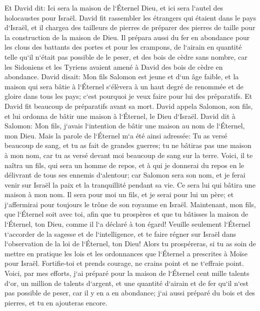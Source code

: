 \verse Et David dit: Ici sera la maison de l`Éternel Dieu, et ici sera l`autel des holocaustes pour Israël. 
\verse David fit rassembler les étrangers qui étaient dans le pays d`Israël, et il chargea des tailleurs de pierres de préparer des pierres de taille pour la construction de la maison de Dieu. 
\verse Il prépara aussi du fer en abondance pour les clous des battants des portes et pour les crampons, de l`airain en quantité telle qu`il n`était pas possible de le peser, 
\verse et des bois de cèdre sans nombre, car les Sidoniens et les Tyriens avaient amené à David des bois de cèdre en abondance. 
\verse David disait: Mon fils Salomon est jeune et d`un âge faible, et la maison qui sera bâtie à l`Éternel s`élèvera à un haut degré de renommée et de gloire dans tous les pays; c`est pourquoi je veux faire pour lui des préparatifs. Et David fit beaucoup de préparatifs avant sa mort. 
\verse David appela Salomon, son fils, et lui ordonna de bâtir une maison à l`Éternel, le Dieu d`Israël. 
\verse David dit à Salomon: Mon fils, j`avais l`intention de bâtir une maison au nom de l`Éternel, mon Dieu. 
\verse Mais la parole de l`Éternel m`a été ainsi adressée: Tu as versé beaucoup de sang, et tu as fait de grandes guerres; tu ne bâtiras pas une maison à mon nom, car tu as versé devant moi beaucoup de sang sur la terre. 
\verse Voici, il te naîtra un fils, qui sera un homme de repos, et à qui je donnerai du repos en le délivrant de tous ses ennemis d`alentour; car Salomon sera son nom, et je ferai venir sur Israël la paix et la tranquillité pendant sa vie. 
\verse Ce sera lui qui bâtira une maison à mon nom. Il sera pour moi un fils, et je serai pour lui un père; et j`affermirai pour toujours le trône de son royaume en Israël. 
\verse Maintenant, mon fils, que l`Éternel soit avec toi, afin que tu prospères et que tu bâtisses la maison de l`Éternel, ton Dieu, comme il l`a déclaré à ton égard! 
\verse Veuille seulement l`Éternel t`accorder de la sagesse et de l`intelligence, et te faire régner sur Israël dans l`observation de la loi de l`Éternel, ton Dieu! 
\verse Alors tu prospéreras, si tu as soin de mettre en pratique les lois et les ordonnances que l`Éternel a prescrites à Moïse pour Israël. Fortifie-toi et prends courage, ne crains point et ne t`effraie point. 
\verse Voici, par mes efforts, j`ai préparé pour la maison de l`Éternel cent mille talents d`or, un million de talents d`argent, et une quantité d`airain et de fer qu`il n`est pas possible de peser, car il y en a en abondance; j`ai aussi préparé du bois et des pierres, et tu en ajouteras encore. 
